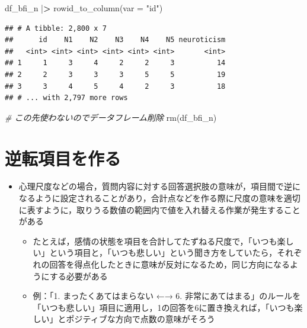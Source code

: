 \documentclass[
  xelatex,ja=standard, b5paper]{bxjsbook}
\newenvironment{Shaded}{\begin{snugshade}}{\end{snugshade}}
\newcommand{\AttributeTok}[1]{\textcolor[rgb]{0.77,0.63,0.00}{#1}}
\newcommand{\CommentTok}[1]{\textcolor[rgb]{0.56,0.35,0.01}{\textit{#1}}}
\newcommand{\ErrorTok}[1]{\textcolor[rgb]{0.64,0.00,0.00}{\textbf{#1}}}
\newcommand{\FunctionTok}[1]{\textcolor[rgb]{0.00,0.00,0.00}{#1}}
\newcommand{\NormalTok}[1]{#1}
\newcommand{\SpecialCharTok}[1]{\textcolor[rgb]{0.00,0.00,0.00}{#1}}
\newcommand{\StringTok}[1]{\textcolor[rgb]{0.31,0.60,0.02}{#1}}
\providecommand{\tightlist}{%
  \setlength{\itemsep}{0pt}\setlength{\parskip}{0pt}}
\begin{document}
\begin{Shaded}
\begin{Highlighting}[]
\NormalTok{df\_bfi\_n }\SpecialCharTok{|}\ErrorTok{\textgreater{}} 
  \FunctionTok{rowid\_to\_column}\NormalTok{(}\AttributeTok{var =} \StringTok{"id"}\NormalTok{)}
\end{Highlighting}
\end{Shaded}

\begin{verbatim}
## # A tibble: 2,800 x 7
##      id    N1    N2    N3    N4    N5 neuroticism
##   <int> <int> <int> <int> <int> <int>       <int>
## 1     1     3     4     2     2     3          14
## 2     2     3     3     3     5     5          19
## 3     3     4     5     4     2     3          18
## # ... with 2,797 more rows
\end{verbatim}

\begin{Shaded}
\begin{Highlighting}[]
\CommentTok{\# この先使わないのでデータフレーム削除}
\FunctionTok{rm}\NormalTok{(df\_bfi\_n)}
\end{Highlighting}
\end{Shaded}

\hypertarget{mu-rev}{%
\section{逆転項目を作る}\label{mu-rev}}

\begin{itemize}
\tightlist
\item
  心理尺度などの場合，質問内容に対する回答選択肢の意味が，項目間で逆になるように設定されることがあり，合計点などを作る際に尺度の意味を適切に表すように，取りうる数値の範囲内で値を入れ替える作業が発生することがある

  \begin{itemize}
  \tightlist
  \item
    たとえば，感情の状態を項目を合計してたずねる尺度で，「いつも楽しい」という項目と，「いつも悲しい」という聞き方をしていたら，それぞれの回答を得点化したときに意味が反対になるため，同じ方向になるようにする必要がある
  \item
    例：「1. まったくあてはまらない ←→ 6. 非常にあてはまる」のルールを「いつも悲しい」項目に適用し，1の回答を6に置き換えれば，「いつも楽しい」とポジティブな方向で点数の意味がそろう
  \end{itemize}
\end{itemize}
\end{document}
